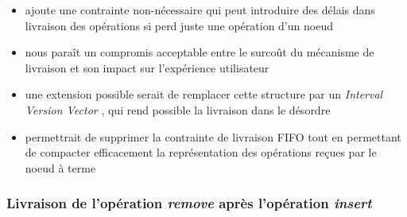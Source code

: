 \documentclass[12pt]{thesul}
\begin{document}
\begin{itemize}
  \item ajoute une contrainte non-nécessaire qui peut introduire des délais dans livraison des opérations si perd juste une opération d'un noeud
  \item nous paraît un compromis acceptable entre le surcoût du mécanisme de livraison et son impact sur l'expérience utilisateur
  \item une extension possible serait de remplacer cette structure par un \emph{Interval Version Vector} \cite{2014-optimized-or-sets}, qui rend possible la livraison dans le désordre
  \item permettrait de supprimer la contrainte de livraison FIFO tout en permettant de compacter efficacement la représentation des opérations reçues par le noeud à terme
\end{itemize}

\subsubsection{Livraison de l'opération \emph{remove} après l'opération \emph{insert}}
\end{document}
